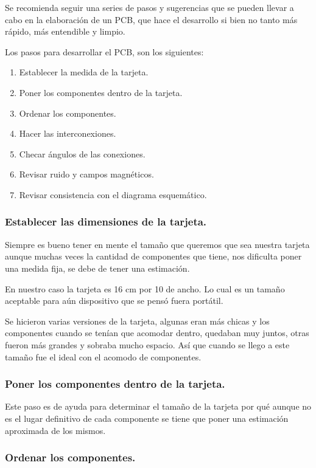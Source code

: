 Se recomienda seguir una series de pasos y sugerencias que se pueden llevar a cabo en la elaboración de un PCB, que hace el desarrollo si bien no tanto más rápido, más entendible y limpio.

Los pasos para desarrollar el PCB, son los siguientes:
\begin{enumerate}
\item Establecer la medida de la tarjeta.
\item Poner los componentes dentro de la tarjeta.
\item Ordenar los componentes.
\item Hacer las interconexiones.
\item Checar ángulos de las conexiones.
\item Revisar ruido y campos magnéticos.
\item Revisar consistencia con el diagrama esquemático.
\end{enumerate}

\subsubsection*{Establecer las dimensiones de la tarjeta.}

Siempre es bueno tener en mente el tamaño que queremos que sea nuestra tarjeta aunque muchas veces la cantidad de componentes que tiene, nos dificulta poner una medida fija, se debe de tener una estimación.

En nuestro caso la tarjeta es 16 cm por 10 de ancho. Lo cual es un tamaño aceptable para aún dispositivo que se pensó fuera portátil.

Se hicieron varias versiones de la tarjeta, algunas eran más chicas y los componentes cuando se tenían que acomodar dentro, quedaban muy juntos, otras fueron más grandes y sobraba mucho espacio. Así que cuando se llego a este tamaño fue el ideal con el acomodo de componentes.

\subsubsection*{Poner los componentes dentro de la tarjeta.}

Este paso es de ayuda para determinar el tamaño de la tarjeta por qué aunque no es el lugar definitivo de cada componente se tiene que poner una estimación aproximada de los mismos. 

\subsubsection*{Ordenar los componentes.}


